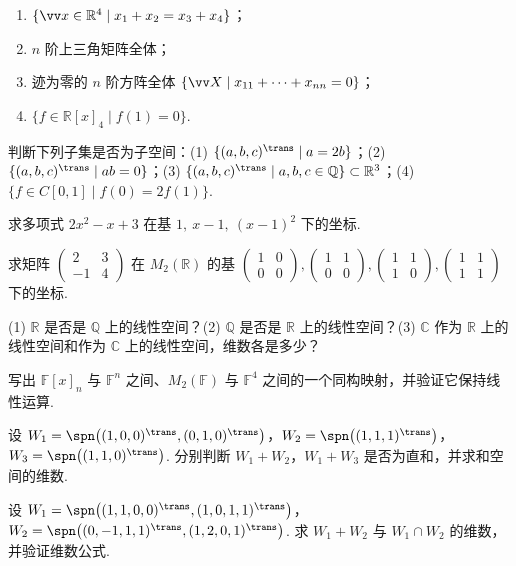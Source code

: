 {\begin{exA}
\begin{enumerate}
				\item $\{\vv x\in\mathbb{R}^4\mid x_1+x_2=x_3+x_4\}$；
				\item $n$ 阶上三角矩阵全体；
				\item 迹为零的 $n$ 阶方阵全体 $\{\vv X\mid x_{11}+\cdots+x_{nn}=0\}$；
				\item $\{f\in\mathbb{R}[x]_4\mid f(1)=0\}$.
			\end{enumerate}
			\item\label{ex:lmap:A6} 判断下列子集是否为子空间：(1) $\{(a,b,c)^\trans\mid a=2b\}$；(2) $\{(a,b,c)^\trans\mid ab=0\}$；(3) $\{(a,b,c)^\trans\mid a,b,c\in\mathbb{Q}\}\subset\mathbb{R}^3$；(4) $\{f\in C[0,1]\mid f(0)=2f(1)\}$.
			\item\label{ex:lmap:A7} 求多项式 $2x^2-x+3$ 在基 $1,\ x-1,\ (x-1)^2$ 下的坐标.
			\item\label{ex:lmap:A8} 求矩阵 $\begin{pmatrix}2&3\\-1&4\end{pmatrix}$ 在 $M_2(\mathbb{R})$ 的基 $\begin{pmatrix}1&0\\0&0\end{pmatrix},\begin{pmatrix}1&1\\0&0\end{pmatrix},\begin{pmatrix}1&1\\1&0\end{pmatrix},\begin{pmatrix}1&1\\1&1\end{pmatrix}$ 下的坐标.
			\item\label{ex:lmap:A9} (1) $\mathbb{R}$ 是否是 $\mathbb{Q}$ 上的线性空间？(2) $\mathbb{Q}$ 是否是 $\mathbb{R}$ 上的线性空间？(3) $\mathbb{C}$ 作为 $\mathbb{R}$ 上的线性空间和作为 $\mathbb{C}$ 上的线性空间，维数各是多少？
			\item\label{ex:lmap:A10} 写出 $\mathbb{F}[x]_n$ 与 $\mathbb{F}^n$ 之间、$M_2(\mathbb{F})$ 与 $\mathbb{F}^4$ 之间的一个同构映射，并验证它保持线性运算.
			\item\label{ex:lmap:A11} 设 $W_1=\spn\big((1,0,0)^\trans,(0,1,0)^\trans\big)$，$W_2=\spn\big((1,1,1)^\trans\big)$，$W_3=\spn\big((1,1,0)^\trans\big)$. 分别判断 $W_1+W_2$，$W_1+W_3$ 是否为直和，并求和空间的维数.
			\item\label{ex:lmap:A12} 设 $W_1=\spn\big((1,1,0,0)^\trans,(1,0,1,1)^\trans\big)$，$W_2=\spn\big((0,-1,1,1)^\trans,(1,2,0,1)^\trans\big)$. 求 $W_1+W_2$ 与 $W_1\cap W_2$ 的维数，并验证维数公式.

\end{exA}}
